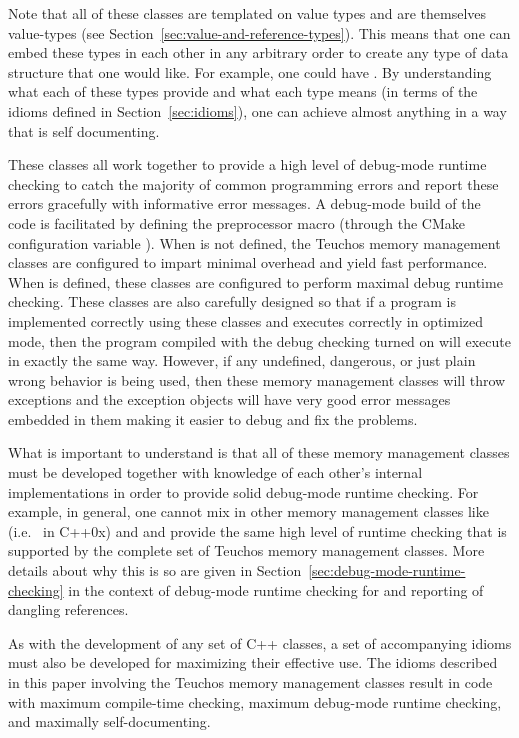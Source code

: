 \documentclass[pdf,ps2pdf,11pt]{SANDreport}
\begin{document}
Note that all of these classes are templated on value types and are
themselves value-types (see
Section~\ref{sec:value-and-reference-types}).  This means that one can
embed these types in each other in any arbitrary order to create any
type of data structure that one would like.  For example, one could
have {}.
By understanding what each of these types provide and what each type
means (in terms of the idioms defined in Section~\ref{sec:idioms}),
one can achieve almost anything in a way that is self documenting.

These classes all work together to provide a high level of debug-mode
runtime checking to catch the majority of common programming errors
and report these errors gracefully with informative error messages.  A
debug-mode build of the code is facilitated by defining the
preprocessor macro {} (through the CMake
configuration variable {}).  When
{} is not defined, the Teuchos memory management
classes are configured to impart minimal overhead and yield fast
performance.  When {} is defined, these classes
are configured to perform maximal debug runtime checking.  These
classes are also carefully designed so that if a program is
implemented correctly using these classes and executes correctly in
optimized mode, then the program compiled with the debug checking
turned on will execute in exactly the same way.  However, if any
undefined, dangerous, or just plain wrong behavior is being used, then
these memory management classes will throw exceptions and the
exception objects will have very good error messages embedded in them
making it easier to debug and fix the problems.

What is important to understand is that all of these memory management
classes must be developed together with knowledge of each other's
internal implementations in order to provide solid debug-mode runtime
checking.  For example, in general, one cannot mix in other memory
management classes like {} (i.e.\
{} in C++0x) and {} and provide
the same high level of runtime checking that is supported by the
complete set of Teuchos memory management classes.  More details about
why this is so are given in
Section~\ref{sec:debug-mode-runtime-checking} in the context of
debug-mode runtime checking for and reporting of dangling references.

As with the development of any set of C++ classes, a set of
accompanying idioms must also be developed for maximizing their
effective use.  The idioms described in this paper involving the
Teuchos memory management classes result in code with maximum
compile-time checking, maximum debug-mode runtime checking, and
maximally self-documenting.
\end{document}
